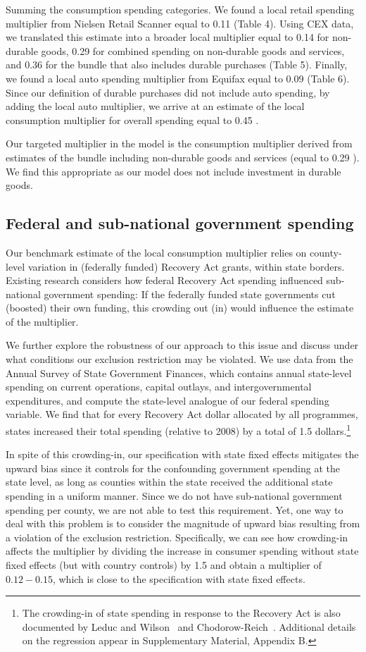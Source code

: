 \documentclass[\latexroot/\projectname]{subfiles}
\begin{document}
Summing the consumption spending categories. We found a local retail spending multiplier from Nielsen Retail Scanner equal to 0.11 (Table 4). Using CEX data, we translated this estimate into a broader local multiplier equal to 0.14 for non-durable goods, 0.29 for combined spending on non-durable goods and services, and 0.36 for the bundle that also includes durable purchases (Table 5). Finally, we found a local auto spending multiplier from Equifax equal to 0.09 (Table 6). Since our definition of durable purchases did not include auto spending, by adding the local auto multiplier, we arrive at an estimate of the local consumption multiplier for overall spending equal to 0.45 .

Our targeted multiplier in the model is the consumption multiplier derived from estimates of the bundle including non-durable goods and services (equal to 0.29 ). We find this appropriate as our model does not include investment in durable goods.

\subsection{Federal and sub-national government spending}
Our benchmark estimate of the local consumption multiplier relies on county-level variation in (federally funded) Recovery Act grants, within state borders. Existing research considers how federal Recovery Act spending influenced sub-national government spending: If the federally funded state governments cut (boosted) their own funding, this crowding out (in) would influence the estimate of the multiplier.

We further explore the robustness of our approach to this issue and discuss under what conditions our exclusion restriction may be violated. We use data from the Annual Survey of State Government Finances, which contains annual state-level spending on current operations, capital outlays, and intergovernmental expenditures, and compute the state-level analogue of our federal spending variable. We find that for every Recovery Act dollar allocated by all programmes, states increased their total spending (relative to 2008) by a total of 1.5 dollars.\footnote{The crowding-in of state spending in response to the Recovery Act is also documented by Leduc and Wilson~\cite{Leduc2017-yn} and Chodorow-Reich~\cite{Chodorow-Reich2019-zl}. Additional details on the regression appear in Supplementary Material, Appendix B.}

In spite of this crowding-in, our specification with state fixed effects mitigates the upward bias since it controls for the confounding government spending at the state level, as long as counties within the state received the additional state spending in a uniform manner. Since we do not have sub-national government spending per county, we are not able to test this requirement. Yet, one way to deal with this problem is to consider the magnitude of upward bias resulting from a violation of the exclusion restriction. Specifically, we can see how crowding-in affects the multiplier by dividing the increase in consumer spending without state fixed effects (but with country controls) by 1.5 and obtain a multiplier of $0.12-0.15$, which is close to the specification with state fixed effects.
\end{document}
